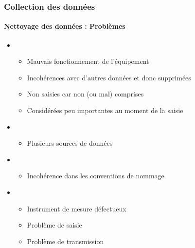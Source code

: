 \documentclass[xcolor=table]{beamer}
\begin{document}
\begin{frame}
	\frametitle{Collection des données}
	\framesubtitle{Nettoyage des données : Problèmes}
	
	\begin{itemize}
		\item {}
		\begin{itemize}
			\item Mauvais fonctionnement de l'équipement
			\item Incohérences avec d'autres données et donc supprimées
			\item Non saisies car non (ou mal) comprises
			\item Considérées peu importantes au moment de la saisie
		\end{itemize}
		\item {}
		\begin{itemize}
			\item Plusieurs sources de données
		\end{itemize}
		\item {}
		\begin{itemize}
			\item Incohérence dans les conventions de nommage
		\end{itemize}
		\item {}
		\begin{itemize}
			\item Instrument de mesure défectueux
			\item Problème de saisie
			\item Problème de transmission
		\end{itemize}
	\end{itemize}
	
\end{frame}
\end{document}
